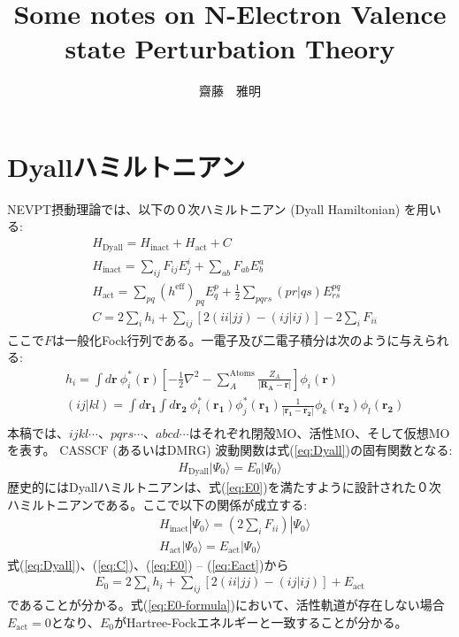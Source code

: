 \documentclass[11pt,pra,aps]{revtex4}
\begin{document}
\title{Some notes on N-Electron Valence state Perturbation Theory}
\author{齋藤　雅明}

\maketitle

\section{Dyallハミルトニアン}

NEVPT摂動理論では、以下の０次ハミルトニアン (Dyall Hamiltonian) を用いる:
%
\begin{align}
  & H_\text{Dyall} = H_\text{inact} + H_\text{act} + C \label{eq:Dyall}\\
  & H_\text{inact} = \sum_{ij} F_{ij} E^i_j + \sum_{ab} F_{ab} E^a_b \\ 
  & H_\text{act}   = \sum_{pq} (h^\text{eff})_{pq}E^p_q + \frac{1}{2}\sum_{pqrs} (pr|qs) E^{pq}_{rs} \\ 
  & C = 2\sum_i h_i + \sum_{ij} [2(ii|jj)-(ij|ij)] - 2\sum_i F_{ii}\label{eq:C}
\end{align}
%
ここで$F$は一般化Fock行列である。一電子及び二電子積分は次のように与えられる:
%
\begin{align}
  & h_i = \int d\mathbf{r} \ \phi^{*}_i (\mathbf{r})\left[-\frac{1}{2}\nabla^{2}-\sum_A^\text{Atoms} \frac{Z_A}{|\mathbf{R_A}-\mathbf{r}|}\right]\phi_i(\mathbf{r}) \\
  & (ij|kl) = \int d\mathbf{r_1} \int d\mathbf{r_2} \ \phi^{*}_i (\mathbf{r_1}) \phi^{*}_j (\mathbf{r_1}) \frac{1}{|\mathbf{r_1}-\mathbf{r_2}|} \phi_k(\mathbf{r_2}) \phi_l(\mathbf{r_2}) \\
\end{align}
%
本稿では、$ijkl\cdots$、$pqrs\cdots$、$abcd\cdots$はそれぞれ閉殻MO、活性MO、そして仮想MOを表す。
%
CASSCF (あるいはDMRG) 波動関数は式(\ref{eq:Dyall})の固有関数となる:
%
\begin{align}
  H_\text{Dyall}|\Psi_0\rangle = E_0|\Psi_0\rangle \label{eq:E0}
\end{align}
%
歴史的にはDyallハミルトニアンは、式(\ref{eq:E0})を満たすように設計された０次ハミルトニアンである。ここで以下の関係が成立する:
%
\begin{align}
  & H_\text{inact}|\Psi_0\rangle = \left(2\sum_i F_{ii}\right)|\Psi_0\rangle \label{eq:Einact}\\
  & H_\text{act}|\Psi_0\rangle = E_\text{act}|\Psi_0\rangle \label{eq:Eact}
\end{align}
%
式(\ref{eq:Dyall})、(\ref{eq:C})、(\ref{eq:E0}) -- (\ref{eq:Eact})から
%
\begin{align}
  E_0 = 2\sum_i h_i + \sum_{ij} [2(ii|jj)-(ij|ij)] + E_\text{act} \label{eq:E0-formula}
\end{align}
%
であることが分かる。式(\ref{eq:E0-formula})において、活性軌道が存在しない場合$E_\text{act}=0$となり、$E_0$がHartree-Fockエネルギーと一致することが分かる。
\end{document}
